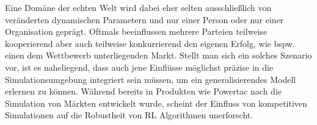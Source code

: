 Eine Domäne der echten Welt wird dabei eher selten ausschließlich von veränderten dynamischen Parametern und nur einer Person oder nur einer Organisation geprägt. 
Oftmals beeinflussen mehrere Parteien teilweise kooperierend aber auch teilweise konkurrierend den eigenen Erfolg, wie bspw. einen dem Wettbewerb unterliegenden Markt.
Stellt man sich ein solches Szenario vor, ist es naheliegend, dass auch jene Einflüsse möglichst präzise in die Simulationsumgebung integriert sein müssen, um ein generalisierendes Modell erlernen zu können.
Während bereits in Produkten wie Powertac nach \cite[][]{COLLINS2022101217} die Simulation von Märkten entwickelt wurde, scheint der Einfluss von kompetitiven Simulationen auf die Robustheit von RL Algorithmen unerforscht.
